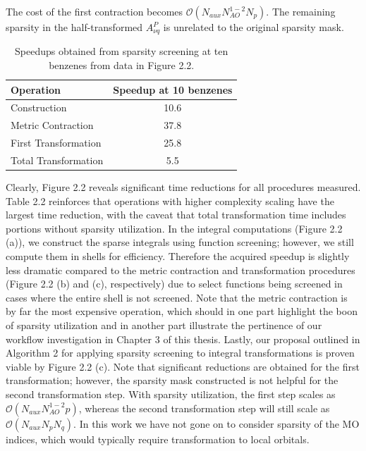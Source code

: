 \noindent The cost of the first contraction becomes $\mathcal{O}(N_{aux}N_{AO}^{1-2}N_p)$. 
The remaining sparsity in the half-transformed $A_{\nu q}^P$ is unrelated to the original sparsity mask.

\begingroup
\begin{table}[H]
\centering
\renewcommand{\baselinestretch}{1}
\caption{Speedups obtained from sparsity screening at ten benzenes from data in Figure 2.2.}
\begin{tabular}{l c}
\multicolumn{1}{l}{\textbf{Operation}} &
\multicolumn{1}{c}{\textbf{Speedup at 10 benzenes}} \\ 
\hline
Construction          & 10.6  \\          
Metric Contraction    & 37.8  \\          
First Transformation  & 25.8  \\          
Total Transformation  & 5.5  \\          
\end{tabular}
\end{table}
\endgroup


Clearly, Figure 2.2 reveals significant time reductions for all procedures measured.
Table 2.2 reinforces that operations with higher complexity scaling have the largest time
reduction, with the caveat that total transformation time includes portions without sparsity utilization.
In the integral computations (Figure 2.2 (a)), we construct the sparse integrals using
function screening; however, we still compute them in shells for efficiency.
Therefore the acquired speedup is slightly less dramatic compared to the metric contraction and
transformation procedures (Figure 2.2 (b) and (c), respectively) due to select functions being 
screened in cases where the entire shell is not screened. 
Note that the metric contraction is by far the most expensive operation, which should in one part
highlight the boon of sparsity utilization and in another part
illustrate the pertinence of our workflow investigation in Chapter 3 of this thesis.
Lastly, our proposal outlined in Algorithm 2 for applying sparsity screening to integral transformations
is proven viable by Figure 2.2 (c). Note that significant reductions are obtained for the
first transformation; however, the sparsity mask constructed is not helpful for the second transformation step.
With sparsity utilization, the first step scales as $\mathcal{O}(N_{aux}N_{AO}^{1-2}p)$,
whereas the second transformation step will still scale as $\mathcal{O}(N_{aux}N_pN_q)$.
In this work we have not gone on to consider sparsity of the MO indices, which would 
typically require transformation to local orbitals.


